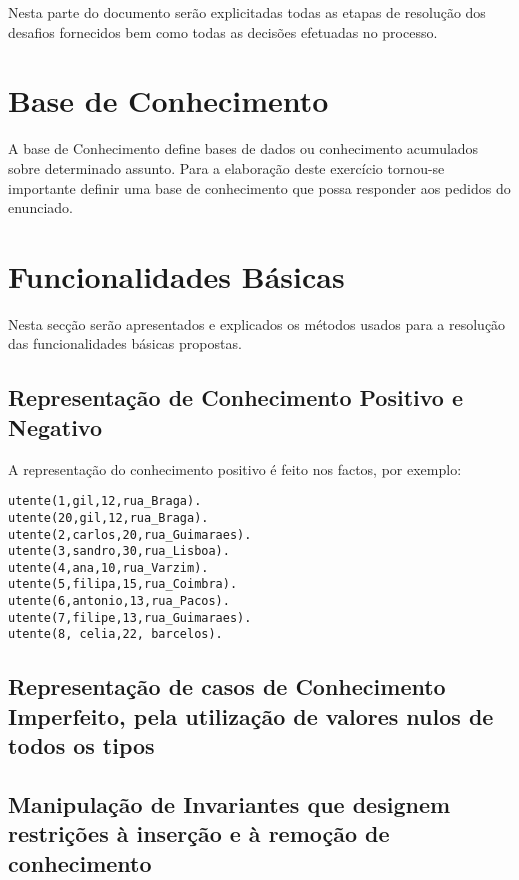 Nesta parte do documento serão explicitadas todas as etapas de resolução dos desafios fornecidos bem como todas as decisões efetuadas no processo.


\section{Base de Conhecimento}
\label{p3:baseConhe}

A base de Conhecimento define bases de dados ou conhecimento acumulados sobre determinado assunto.
Para a elaboração deste exercício tornou-se importante definir uma base de conhecimento que possa responder aos pedidos do enunciado.

\section{Funcionalidades Básicas}
\label{p3:funcbasic}
Nesta secção serão apresentados e explicados os métodos usados para a resolução das funcionalidades básicas propostas.

\subsection{Representação de Conhecimento Positivo e Negativo}

A representação do conhecimento positivo é feito nos factos, por exemplo:

\begin{verbatim}
utente(1,gil,12,rua_Braga).
utente(20,gil,12,rua_Braga).
utente(2,carlos,20,rua_Guimaraes).
utente(3,sandro,30,rua_Lisboa).
utente(4,ana,10,rua_Varzim).
utente(5,filipa,15,rua_Coimbra).
utente(6,antonio,13,rua_Pacos).
utente(7,filipe,13,rua_Guimaraes).
utente(8, celia,22, barcelos). 
\end{verbatim}



\subsection{Representação de casos de Conhecimento Imperfeito, pela utilização de valores nulos de todos os tipos}



\subsection{Manipulação de Invariantes que designem restrições à inserção e à remoção de conhecimento}


